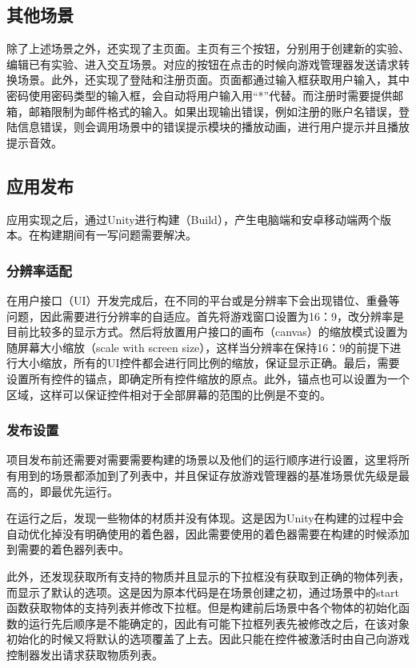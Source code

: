\subsection{其他场景}

    除了上述场景之外，还实现了主页面。主页有三个按钮，分别用于创建新的实验、编辑已有实验、进入交互场景。对应的按钮在点击的时候向游戏管理器发送请求转换场景。此外，还实现了登陆和注册页面。页面都通过输入框获取用户输入，其中密码使用密码类型的输入框，会自动将用户输入用“*”代替。而注册时需要提供邮箱，邮箱限制为邮件格式的输入。如果出现输出错误，例如注册的账户名错误，登陆信息错误，则会调用场景中的错误提示模块的播放动画，进行用户提示并且播放提示音效。

\subsection{应用发布}

    应用实现之后，通过Unity进行构建（Build），产生电脑端和安卓移动端两个版本。在构建期间有一写问题需要解决。
    
\subsubsection{分辨率适配}

    在用户接口（UI）开发完成后，在不同的平台或是分辨率下会出现错位、重叠等问题，因此需要进行分辨率的自适应。首先将游戏窗口设置为16：9，改分辨率是目前比较多的显示方式。然后将放置用户接口的画布（canvas）的缩放模式设置为随屏幕大小缩放（scale with screen size），这样当分辨率在保持16：9的前提下进行大小缩放，所有的UI控件都会进行同比例的缩放，保证显示正确。最后，需要设置所有控件的锚点，即确定所有控件缩放的原点。此外，锚点也可以设置为一个区域，这样可以保证控件相对于全部屏幕的范围的比例是不变的。
    
\subsubsection{发布设置}

    项目发布前还需要对需要需要构建的场景以及他们的运行顺序进行设置，这里将所有用到的场景都添加到了列表中，并且保证存放游戏管理器的基准场景优先级是最高的，即最优先运行。
    
    在运行之后，发现一些物体的材质并没有体现。这是因为Unity在构建的过程中会自动优化掉没有明确使用的着色器，因此需要使用的着色器需要在构建的时候添加到需要的着色器列表中。
    
    此外，还发现获取所有支持的物质并且显示的下拉框没有获取到正确的物体列表，而显示了默认的选项。这是因为原本代码是在场景创建之初，通过场景中的start函数获取物体的支持列表并修改下拉框。但是构建前后场景中各个物体的初始化函数的运行先后顺序是不能确定的，因此有可能下拉框列表先被修改之后，在该对象初始化的时候又将默认的选项覆盖了上去。因此只能在控件被激活时由自己向游戏控制器发出请求获取物质列表。
    
